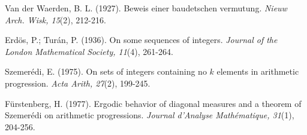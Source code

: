 \documentclass[12pt]{article}
\begin{document}
\begin{thebibliography}{99}
 Van der Waerden, B. L. (1927). Beweis einer baudetschen vermutung. \textit{Nieuw Arch. Wisk, 15}(2), 212-216.

 Erd\"{o}s, P.; Tur\'{a}n, P. (1936). On some sequences of integers. \textit{Journal of the London Mathematical Society, 11}(4), 261-264.

 Szemer\'{e}di, E. (1975). On sets of integers containing no $k$ elements in arithmetic progression. \textit{Acta Arith, 27}(2), 199-245.

 F\"{u}rstenberg, H. (1977). Ergodic behavior of diagonal measures and a theorem of Szemer\'{e}di on arithmetic progressions. \textit{Journal d'Analyse Mathématique, 31}(1), 204-256.

\end{thebibliography}

\end{document}
